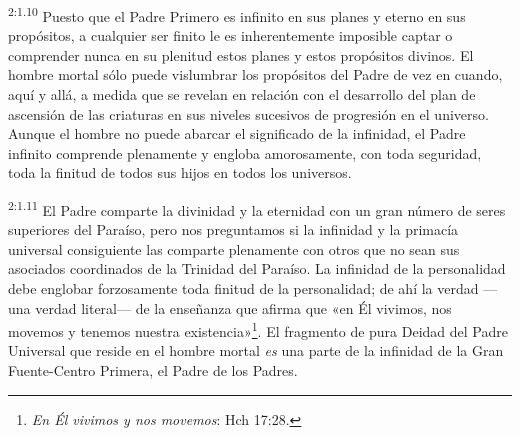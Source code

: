 \par
\textsuperscript{2:1.10} Puesto que el Padre Primero es infinito en sus planes y eterno en sus propósitos, a cualquier ser finito le es inherentemente imposible captar o comprender nunca en su plenitud estos planes y estos propósitos divinos. El hombre mortal sólo puede vislumbrar los propósitos del Padre de vez en cuando, aquí y allá, a medida que se revelan en relación con el desarrollo del plan de ascensión de las criaturas en sus niveles sucesivos de progresión en el universo. Aunque el hombre no puede abarcar el significado de la infinidad, el Padre infinito comprende plenamente y engloba amorosamente, con toda seguridad, toda la finitud de todos sus hijos en todos los universos.

\par
\textsuperscript{2:1.11} El Padre comparte la divinidad y la eternidad con un gran número de seres superiores del Paraíso, pero nos preguntamos si la infinidad y la primacía universal consiguiente las comparte plenamente con otros que no sean sus asociados coordinados de la Trinidad del Paraíso. La infinidad de la personalidad debe englobar forzosamente toda finitud de la personalidad; de ahí la verdad ---una verdad literal--- de la enseñanza que afirma que «en Él vivimos, nos movemos y tenemos nuestra existencia»\footnote{\textit{En Él vivimos y nos movemos}: Hch 17:28.}. El fragmento de pura Deidad del Padre Universal que reside en el hombre mortal \textit{es} una parte de la infinidad de la Gran Fuente-Centro Primera, el Padre de los Padres.

